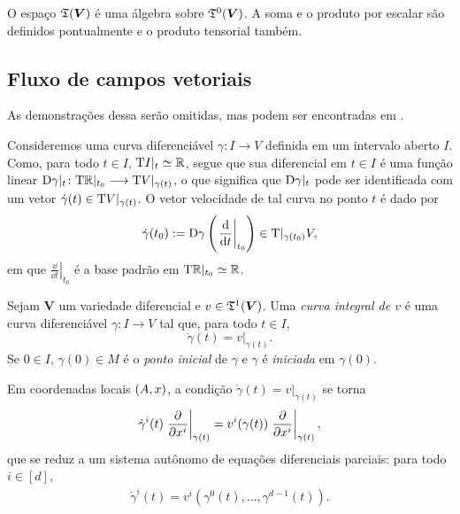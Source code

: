O espaço $\mathfrak{T} (\bm V)$ é uma álgebra sobre $\mathfrak{T}^0(\bm V)$. A soma e o produto por escalar são definidos pontualmente e o produto tensorial também.





\subsection{Fluxo de campos vetoriais}

As demonstrações dessa serão omitidas, mas podem ser encontradas em  \cite{liv:Lee-IntroductionSmoothManifolds}.

Consideremos uma curva diferenciável $\gamma\colon I \to V$ definida em um intervalo aberto $I$. Como, para todo $t \in I$, $\mathrm{T} I|_t \simeq \mathbb{R}$, segue que sua diferencial em $t \in I$ é uma função linear $\mathrm{D} \gamma|_t\colon \allowbreak \mathrm{T} \mathbb{R}|_{t_0} \longrightarrow \mathrm{T} V|_{\gamma(t)}$, o que significa que $\mathrm{D} \gamma|_t$ pode ser identificada com um vetor $\dot \gamma(t) \in \mathrm{T} V|_{\gamma(t)}$. O vetor velocidade de tal curva no ponto $t$ é dado por
	\begin{equation*}
	\dot \gamma(t_0) := \mathrm{D} \gamma \left( \left. \frac{\mathrm{d}}{\mathrm{d} t}\right|_{t_0} \right) \in \mathrm{T}|_{\gamma(t_0)} V,
	\end{equation*}
em que $\left. \frac{\dd}{\dd t}\right|_{t_0}$ é a base padrão em $\mathrm{T} \mathbb{R}|_{t_0} \simeq \mathbb{R}$.%

\begin{definition}
Sejam $\bm V$ um variedade diferencial e $v \in \mathfrak{T}^1(\bm V)$. Uma \emph{curva integral de $v$} é uma curva diferenciável $\gamma\colon I \to V$ tal que, para todo $t \in I$,
	\begin{equation*}
	\dot \gamma(t) = v|_{\gamma(t)}.
	\end{equation*}
Se $0 \in I$, $\gamma(0) \in M$ é o \emph{ponto inicial} de $\gamma$ e $\gamma$ é \emph{iniciada} em $\gamma(0)$.
\end{definition}

Em coordenadas locais $(A,x)$, a condição $\dot \gamma(t) = v|_{\gamma(t)}$ se torna
	\begin{equation*}
	\dot \gamma^i(t) \left. \frac{\partial{}}{\partial{x^i}} \right|_{\gamma(t)} = v^i(\gamma(t)) \left. \frac{\partial{}}{\partial{x^i}} \right|_{\gamma(t)},
	\end{equation*}
que se reduz a um sistema autônomo de equações diferenciais parciais: para todo $i \in [d]$,
	\begin{align*}
	\dot \gamma^i(t) = v^i(\gamma^0(t),\ldots,\gamma^{d-1}(t)).
	\end{align*}


